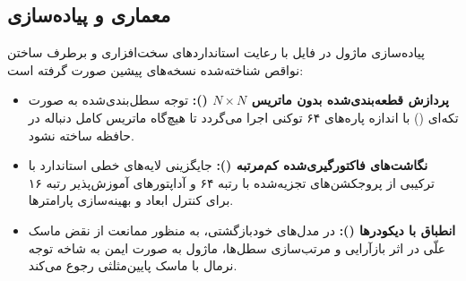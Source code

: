 \subsection{معماری و پیاده‌سازی}
پیاده‌سازی ماژول  در فایل  با رعایت استانداردهای سخت‌افزاری و برطرف ساختن نواقص شناخته‌شده نسخه‌های پیشین صورت گرفته است:
\begin{itemize}
    \item \textbf{پردازش قطعه‌بندی‌شده بدون ماتریس $N \times N$ ():} توجه سطل‌بندی‌شده به صورت تکه‌ای () با اندازه پاره‌های ۶۴ توکنی اجرا می‌گردد تا هیچ‌گاه ماتریس کامل دنباله در حافظه ساخته نشود.
    \item \textbf{نگاشت‌های فاکتورگیری‌شده کم‌مرتبه ():} جایگزینی لایه‌های خطی استاندارد با ترکیبی از پروجکشن‌های تجزیه‌شده  با رتبه ۶۴ و آداپتورهای آموزش‌پذیر رتبه ۱۶ برای کنترل ابعاد و بهینه‌سازی پارامترها.
    \item \textbf{انطباق با دیکودرها ():} در مدل‌های خودبازگشتی، به منظور ممانعت از نقض ماسک علّی در اثر بازآرایی و مرتب‌سازی سطل‌ها، ماژول به صورت ایمن به شاخه توجه نرمال با ماسک پایین‌مثلثی رجوع می‌کند.
\end{itemize}
